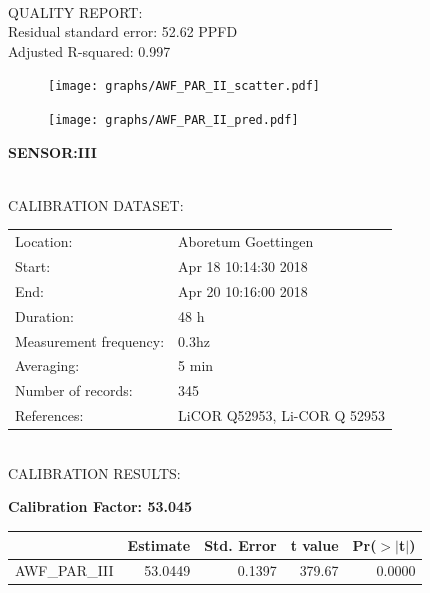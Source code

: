 \documentclass[oneside]{report}
\begin{document}
\hrulefill\\
QUALITY REPORT:\\
Residual standard error: 52.62 PPFD\\
Adjusted R-squared: 0.997



\begin{figure}[H]
  \centering
  \texttt{[image: graphs/AWF\_PAR\_II\_scatter.pdf]}
\end{figure}




\begin{figure}[H]
  \centering
  \texttt{[image: graphs/AWF\_PAR\_II\_pred.pdf]}
\end{figure}

\pagebreak


\begin{center}
\large{\textbf{SENSOR:III}}\\
\end{center}

\hrulefill\\
CALIBRATION DATASET:\\
\begin{table}[h!]
  \centering
  \label{tab:table1}
  \begin{tabular}{ll}
    Location: & Aboretum Goettingen\\ 
    
    
    Start:  & Apr 18 10:14:30 2018 \\
    End:   & Apr 20 10:16:00 2018\\ 
    Duration: & 48 h\\
    Measurement frequency: & 0.3hz\\
    Averaging:  &5 min\\
    Number of records: & 345 \\
    References: & LiCOR Q52953, Li-COR Q 52953 \\
  \end{tabular}
\end{table}

\hrulefill\\
CALIBRATION RESULTS:\\


\begin{center}
\textbf{\large{Calibration Factor: 53.045}}\\
\end{center}
\begin{table}[ht]
\centering
\begin{tabular}{rrrrr}
  \hline
 & Estimate & Std. Error & t value & Pr($>$$|$t$|$) \\ 
  \hline
AWF\_PAR\_III & 53.0449 & 0.1397 & 379.67 & 0.0000 \\ 
   \hline
\end{tabular}
\end{table}
\end{document}
